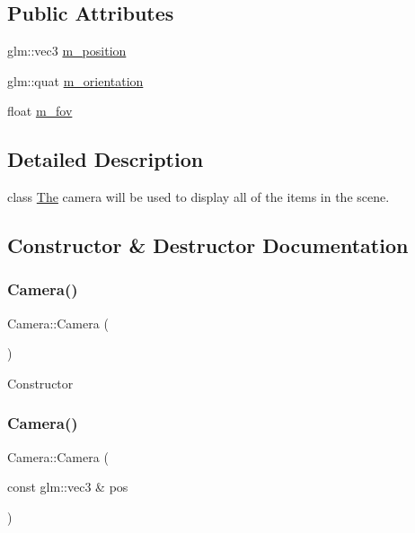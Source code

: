 \subsection*{Public Attributes}
\begin{DoxyCompactItemize}
\item 
glm\+::vec3 \mbox{\hyperlink{class_camera_aa4d06d49524248f81823444fa2544da0}{m\+\_\+position}}
\item 
glm\+::quat \mbox{\hyperlink{class_camera_ac035d6cb4b4bae255d6d12f51137357e}{m\+\_\+orientation}}
\item 
float \mbox{\hyperlink{class_camera_aa404a4e057fa16fb82ce8668d7a661b6}{m\+\_\+fov}}
\end{DoxyCompactItemize}


\subsection{Detailed Description}
class \mbox{\hyperlink{class_the}{The}} camera will be used to display all of the items in the scene. 

\subsection{Constructor \& Destructor Documentation}
\mbox{\label{class_camera_a01f94c3543f56ede7af49dc778f19331}} 
\subsubsection{\texorpdfstring{Camera()}{Camera()}\hspace{0.1cm}{\footnotesize\ttfamily [1/3]}}
{\footnotesize\ttfamily Camera\+::\+Camera (\begin{DoxyParamCaption}{ }\end{DoxyParamCaption})\hspace{0.3cm}{\ttfamily [inline]}}

Constructor \mbox{\label{class_camera_acee2a1b3d56b0f141a3c6ee82735ed39}} 
\subsubsection{\texorpdfstring{Camera()}{Camera()}\hspace{0.1cm}{\footnotesize\ttfamily [2/3]}}
{\footnotesize\ttfamily Camera\+::\+Camera (\begin{DoxyParamCaption}\item[{const glm\+::vec3 \&}]{pos }\end{DoxyParamCaption})\hspace{0.3cm}{\ttfamily [inline]}}

